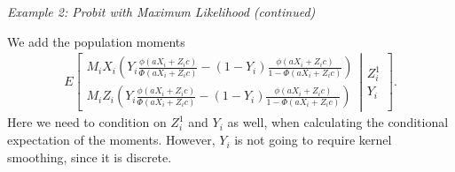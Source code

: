 \documentclass{article}
\theoremstyle{definition}
\theoremstyle{remark}
\begin{document}
\emph{Example 2: Probit with Maximum Likelihood (continued)}

We add the population moments
\begin{align*}
E\left[\left.\begin{array}{c}
M_i X_i\left(Y_i \frac{\phi(aX_i+Z_ic)}{\Phi(aX_i+Z_ic)} - (1-Y_i)\frac{\phi(aX_i+Z_ic)}{1-\Phi(aX_i+Z_ic)}\right) \\
M_i Z_i\left(Y_i \frac{\phi(aX_i+Z_ic)}{\Phi(aX_i+Z_ic)} - (1-Y_i)\frac{\phi(aX_i+Z_ic)}{1-\Phi(aX_i+Z_ic)}\right)
\end{array}
\right| \begin{array}{c} Z_i^1 \\ Y_i \end{array}\right].
\end{align*}
Here we need to condition on $Z_i^1$ and $Y_i$ as well, when calculating the conditional expectation of the moments. However, $Y_i$ is not going to require kernel smoothing, since it is discrete.
\end{document}
